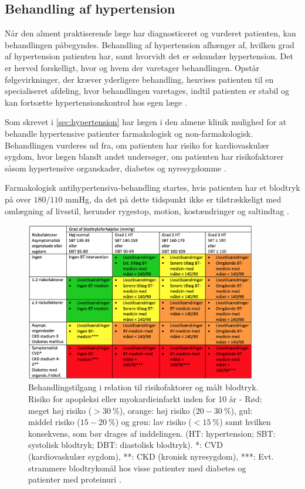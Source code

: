 \subsection{Behandling af hypertension} \label{sec:beh_hypertension}

Når den alment praktiserende læge har diagnosticeret og vurderet patienten, kan behandlingen påbegyndes. Behandling af hypertension afhænger af, hvilken grad af hypertension patienten har, samt hvorvidt det er sekundær hypertension. Det er herved forskelligt, hvor og hvem der varetager behandlingen. Opstår følgevirkninger, der kræver yderligere behandling, henvises patienten til en specialiseret afdeling, hvor behandlingen varetages, indtil patienten er stabil og kan fortsætte hypertensionskontrol hos egen læge \citep{sundhedsstyrelsen2010}.

Som skrevet i \autoref{sec:hypertension} har lægen i den almene klinik mulighed for at behandle hypertensive patienter farmakologisk og non-farmakologisk. Behandlingen vurderes ud fra, om patienten har risiko for kardiovaskulær sygdom, hvor lægen blandt andet undersøger, om patienten har risikofaktorer såsom hypertensive organskader, diabetes og nyresygdomme \citep{promedicin2016}.

Farmakologisk antihypertensiva-behandling startes, hvis patienten har et blodtryk på over $180$/$110$ mmHg, da det på dette tidspunkt ikke er tilstrækkeligt med omlægning af livsstil, herunder rygestop, motion, kostændringer og saltindtag \citep{pedersen2016, bech2015}. 

\begin{figure}[H]
\centering
\includegraphics[width=0.9\textwidth]{figures/behandlingsvejl}
\caption{Behandlingstilgang i relation til risikofaktorer og målt blodtryk. Risiko for apopleksi eller myokardieinfarkt inden for 10 år - Rød: meget høj risiko ($>30~\%$), orange: høj risiko ($20-30~\%$), gul: middel risiko ($15-20~\%$) og grøn: lav risiko ($<15~\%$) samt hvilken konsekvens, som bør drages af inddelingen. (HT: hypertension; SBT: systolisk blodtryk; DBT: diastolisk blodtryk). *: CVD (kardiovaskulær sygdom), **: CKD (kronisk nyresygdom), ***: Evt. strammere blodtryksmål hos visse patienter med diabetes og patienter med proteinuri \citep{bech2015}.}
\label{fig:behandlingsvejl}
\end{figure}

